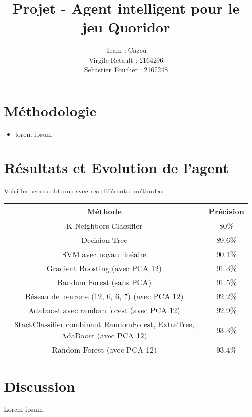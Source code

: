 \documentclass[12pt]{article}
\title{Projet - Agent intelligent pour le jeu Quoridor}
\author{
  Team : Cazou\\
  Virgile Retault : 2164296\\
  Sebastien Foucher : 2162248
}
\begin{document}
\maketitle

\section*{Méthodologie}
\newpage

\begin{itemize}
	\item lorem ipsum
	
\end{itemize}


\section*{Résultats et Evolution de l'agent}

Voici les scores obtenus avec ces différentes méthodes:
\begin{center}
	\begin{tabular}{ |c|c| }
		\hline
		Méthode & Précision \\\hline\hline
	  K-Neighbors Classifier & 80\% \\\hline
		Decision Tree & 89.6\% \\\hline
		SVM avec noyau linéaire & 90.1\% \\\hline
		Gradient Boosting (avec PCA 12) & 91.3\% \\\hline
		Random Forest (sans PCA) & 91.5\% \\\hline
		Réseau de neurone (12, 6, 6, 7) (avec PCA 12) & 92.2\% \\\hline
		Adaboost avec random forest (avec PCA 12) & 92.9\% \\\hline
		StackClassifier combinant RandomForest, ExtraTree, AdaBoost (avec PCA 12) & 93.3\% \\\hline
		Random Forest (avec PCA 12) & 93.4\% \\\hline

	\end{tabular} 
\end{center}


\section*{Discussion}

Lorem ipsum
\end{document}
